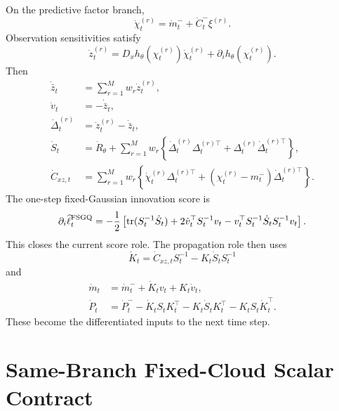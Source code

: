 On the predictive factor branch,
\begin{equation}
  \dot\chi_t^{(r)}=
  \dot m_t^-+\dot C_t^-\xi^{(r)}.
  \label{eq:bf-hd-sgqf-dot-obs-place}
\end{equation}
Observation sensitivities satisfy
\begin{equation}
  \dot z_t^{(r)}=
  D_xh_\theta(\chi_t^{(r)})\dot\chi_t^{(r)}
  +\partial_i h_\theta(\chi_t^{(r)}).
  \label{eq:bf-hd-sgqf-dot-obs-values}
\end{equation}
Then
\begin{align}
  \dot{\bar z}_t&=\sum_{r=1}^M w_r\dot z_t^{(r)},
  \label{eq:bf-hd-sgqf-dot-zbar}\\
  \dot v_t&=-\dot{\bar z}_t,
  \label{eq:bf-hd-sgqf-dot-v}\\
  \dot\Delta_t^{(r)}&=\dot z_t^{(r)}-\dot{\bar z}_t,
  \label{eq:bf-hd-sgqf-dot-Delta}\\
  \dot S_t&=\dot R_\theta+
  \sum_{r=1}^M w_r\left\{\dot\Delta_t^{(r)}\Delta_t^{(r)\top}+
  \Delta_t^{(r)}\dot\Delta_t^{(r)\top}\right\},
  \label{eq:bf-hd-sgqf-dot-S}\\
  \dot C_{xz,t}&=
  \sum_{r=1}^M w_r\left\{\dot\chi_t^{(r)}\Delta_t^{(r)\top}+
  (\chi_t^{(r)}-m_t^-)\dot\Delta_t^{(r)\top}\right\}.
  \label{eq:bf-hd-sgqf-dot-Cxz}
\end{align}
The one-step fixed-Gaussian innovation score is
\begin{equation}
  \partial_i\widehat\ell_t^{\rm FSGQ}
  =
  -\frac12\left[
    \operatorname{tr}(S_t^{-1}\dot S_t)
    +2\dot v_t^\top S_t^{-1}v_t
    -v_t^\top S_t^{-1}\dot S_tS_t^{-1}v_t
  \right].
  \label{eq:bf-hd-sgqf-score}
\end{equation}
This closes the current score role.  The propagation role then uses
\begin{equation}
  \dot K_t=
  \dot C_{xz,t}S_t^{-1}-K_t\dot S_tS_t^{-1}
  \label{eq:bf-hd-sgqf-dot-K}
\end{equation}
and
\begin{align}
  \dot m_t&=\dot m_t^-+\dot K_tv_t+K_t\dot v_t,
  \label{eq:bf-hd-sgqf-dot-m}\\
  \dot P_t&=\dot P_t^- -\dot K_tS_tK_t^\top-K_t\dot S_tK_t^\top-K_tS_t\dot K_t^\top.
  \label{eq:bf-hd-sgqf-dot-P}
\end{align}
These become the differentiated inputs to the next time step.

\section{Same-Branch Fixed-Cloud Scalar Contract}
\label{sec:bf-hd-sgqf-same-branch}

